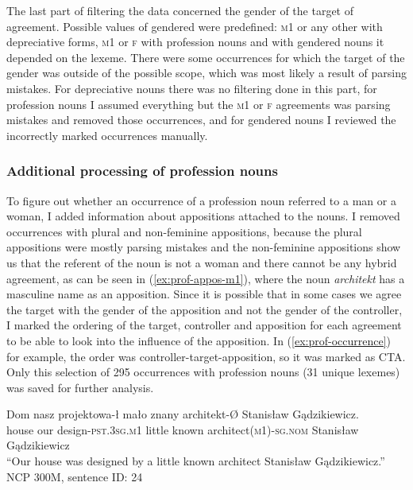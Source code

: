 The last part of filtering the data concerned the gender of the target of agreement. Possible values of gendered were predefined: \textsc{m1} or any other with depreciative forms, \textsc{m1} or \textsc{f} with profession nouns and with gendered nouns it depended on the lexeme. There were some occurrences for which the target of the gender was outside of the possible scope, which was most likely a result of parsing mistakes. For depreciative nouns there was no filtering done in this part, for profession nouns I assumed everything but the \textsc{m1} or \textsc{f} agreements was parsing mistakes and removed those occurrences, and for gendered nouns I reviewed the incorrectly marked occurrences manually. 

\subsubsection{Additional processing of profession nouns}
To figure out whether an occurrence of a profession noun referred to a man or a woman, I added information about appositions attached to the nouns. I removed occurrences with plural and non-feminine appositions, because the plural appositions were mostly parsing mistakes and the non-feminine appositions show us that the referent of the noun is not a woman and there cannot be any hybrid agreement, as can be seen in (\ref{ex:prof-appos-m1}), where the noun \textsl{architekt} has a masculine name as an apposition. Since it is possible that in some cases we agree the target with the gender of the apposition and not the gender of the controller, I marked the ordering of the target, controller and apposition for each agreement to be able to look into the influence of the apposition. In (\ref{ex:prof-occurrence}) for example, the order was controller-target-apposition, so it was marked as CTA. Only this selection of 295 occurrences with profession nouns (31 unique lexemes) was saved for further analysis.

\begin{exe}
  \ex\label{ex:prof-appos-m1}
  \gll Dom nasz projektowa-ł mało znany architekt-Ø Stanisław Gądzikiewicz.\\
  house our design\textsc{-pst.3sg.m1} little known architect\textsc{(m1)-sg.nom} Stanisław Gądzikiewicz\\
  \glt ``Our house was designed by a little known architect Stanisław Gądzikiewicz.''\\
  NCP 300M, sentence ID: 24
\end{exe}

